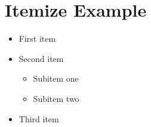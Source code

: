 \documentclass[ensem,french]{myreport}
\begin{document}
\section{Itemize Example}
\begin{itemize}
    \item First item
    \item Second item
    \begin{itemize}
        \item Subitem one
        \item Subitem two
    \end{itemize}
    \item Third item
\end{itemize}
\end{document}
